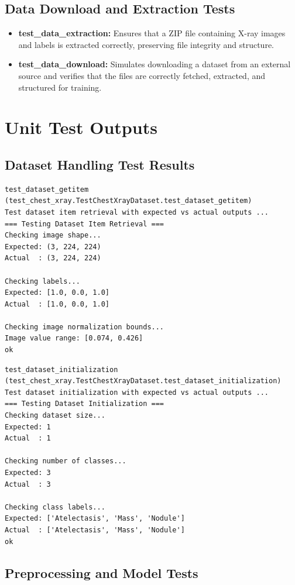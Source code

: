 \documentclass[12pt, titlepage]{article}
\begin{document}
\subsection{Data Download and Extraction Tests}
\begin{itemize}
    \item \textbf{test\_data\_extraction:} Ensures that a ZIP file containing X-ray images and labels is extracted correctly, preserving file integrity and structure.
    \item \textbf{test\_data\_download:} Simulates downloading a dataset from an external source and verifies that the files are correctly fetched, extracted, and structured for training.
\end{itemize}

\section{Unit Test Outputs}

\subsection{Dataset Handling Test Results}
\begin{verbatim}
test_dataset_getitem (test_chest_xray.TestChestXrayDataset.test_dataset_getitem)
Test dataset item retrieval with expected vs actual outputs ...
=== Testing Dataset Item Retrieval ===
Checking image shape...
Expected: (3, 224, 224)
Actual  : (3, 224, 224)

Checking labels...
Expected: [1.0, 0.0, 1.0]
Actual  : [1.0, 0.0, 1.0]

Checking image normalization bounds...
Image value range: [0.074, 0.426]
ok
\end{verbatim}

\begin{verbatim}
test_dataset_initialization (test_chest_xray.TestChestXrayDataset.test_dataset_initialization)
Test dataset initialization with expected vs actual outputs ...
=== Testing Dataset Initialization ===
Checking dataset size...
Expected: 1
Actual  : 1

Checking number of classes...
Expected: 3
Actual  : 3

Checking class labels...
Expected: ['Atelectasis', 'Mass', 'Nodule']
Actual  : ['Atelectasis', 'Mass', 'Nodule']
ok
\end{verbatim}

\subsection{Preprocessing and Model Tests}
\end{document}
